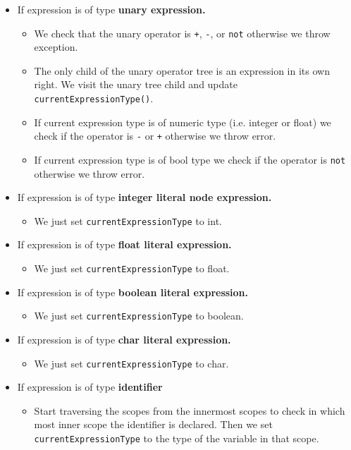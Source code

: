 \begin{itemize}
	      	      	        
	\item If expression is of type \textbf{unary expression.}
	      \begin{itemize}
	      	\item We check that the unary operator is \verb!+!, \verb!-!, or \verb!not! otherwise we throw exception. \item The only child of the unary operator tree is an expression in its own right. We visit the unary tree child and update \verb!currentExpressionType()!.
	      	\item If current expression type is of numeric type (i.e. integer or float) we check if the operator is \verb!-! or \verb!+! otherwise we throw error.
	      	\item If current expression type is of bool type we check if the operator is \verb!not! otherwise we throw error.
	      \end{itemize}
	      	      	        
	\item If expression is of type \textbf{integer literal node expression.}
	      \begin{itemize}
	      	\item We just set \verb!currentExpressionType! to int.
	      \end{itemize}
	\item If expression is of type \textbf{float literal expression.}
	      \begin{itemize}
	      	\item We just set \verb!currentExpressionType! to float.
	      \end{itemize}
	\item If expression is of type \textbf{boolean literal expression.}
	      \begin{itemize}
	      	\item We just set \verb!currentExpressionType! to boolean.
	      \end{itemize}
	\item If expression is of type \textbf{char literal expression.}
	      	      	          
	      \begin{itemize}
	      	\item We just set \verb!currentExpressionType! to char.
	      \end{itemize}
	\item If expression is of type \textbf{identifier}
	      \begin{itemize}
	      	\item Start traversing the scopes from the innermost scopes to check in which most inner scope the identifier is declared. Then we set \verb!currentExpressionType! to the type of the variable in that scope.
	      \end{itemize}
	      	      	       

\end{itemize}
